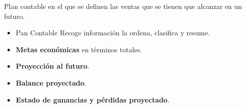 \Large
Plan contable en el que se definen las ventas que se tienen  que alcanzar en un futuro.\\
\begin{itemize}
\item Pan Contable Recoge información la ordena, clasifica y resume.\\
\item \textbf{Metas económicas} en términos totales.\\
\item \textbf{Proyección al futuro}.\\
\item \textbf{Balance proyectado}.\\
\item \textbf{Estado de ganancias y pérdidas proyectado}.\\
\end{itemize}

